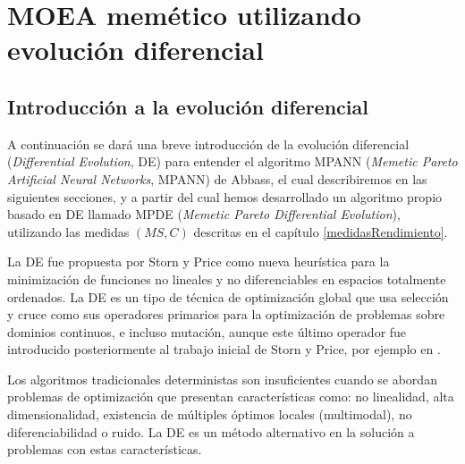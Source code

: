 \chapter{MOEA memético utilizando evolución diferencial}\label{diferencial}
\section{Introducción a la evolución diferencial}
\noindent A continuación se dará una breve introducción de la evolución diferencial
(\textit{Differential Evolution}, DE) \cite{Storn1997} para entender el algoritmo MPANN
(\textit{Memetic Pareto Artificial Neural Networks}, MPANN) de Abbass, el cual
describiremos en las siguientes secciones, y a partir del cual hemos desarrollado un
algoritmo propio basado en DE llamado MPDE (\textit{Memetic Pareto Differential Evolution}),
utilizando las medidas $(MS,C)$ descritas en el capítulo \ref{medidasRendimiento}.

La DE fue propuesta por Storn y Price \cite{Storn1997} como nueva
heurística para la minimización de funciones no lineales y no diferenciables en espacios
totalmente ordenados. La  DE  es  un  tipo  de técnica de optimización  global que  usa
selección y cruce como sus operadores primarios para la optimización
de problemas sobre dominios continuos, e incluso mutación, aunque este último operador
fue introducido posteriormente al trabajo inicial de Storn y Price, por ejemplo en
\cite{Abbass2002a}.

Los algoritmos tradicionales deterministas son insuficientes cuando se abordan problemas de
optimización que presentan características como: no linealidad, alta dimensionalidad, existencia de
múltiples óptimos locales (multimodal), no diferenciabilidad o ruido. La DE es un método alternativo
en la solución a problemas con estas características.

